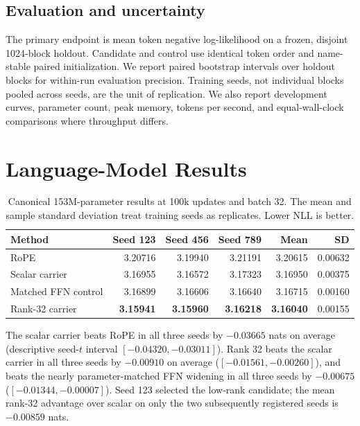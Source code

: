 \documentclass{article}
\begin{document}
\subsection{Evaluation and uncertainty}

The primary endpoint is mean token negative log-likelihood on a frozen,
disjoint 1024-block holdout. Candidate and control use identical token order
and name-stable paired initialization. We report paired bootstrap intervals
over holdout blocks for within-run evaluation precision. Training seeds, not
individual blocks pooled across seeds, are the unit of replication. We also
report development curves, parameter count, peak memory, tokens per second,
and equal-wall-clock comparisons where throughput differs.

\section{Language-Model Results}

\begin{table}[t]
\centering
\caption{Canonical 153M-parameter results at 100k updates and batch 32. The
mean and sample standard deviation treat training seeds as replicates. Lower
NLL is better.}
\label{tab:mature}
\begin{tabular}{lrrrrr}
\toprule
Method & Seed 123 & Seed 456 & Seed 789 & Mean & SD \\
\midrule
RoPE & 3.20716 & 3.19940 & 3.21191 & 3.20615 & 0.00632 \\
Scalar carrier & 3.16955 & 3.16572 & 3.17323 & 3.16950 & 0.00375 \\
Matched FFN control & 3.16899 & 3.16606 & 3.16640 & 3.16715 & 0.00160 \\
Rank-32 carrier & \textbf{3.15941} & \textbf{3.15960} & \textbf{3.16218}
  & \textbf{3.16040} & 0.00155 \\
\bottomrule
\end{tabular}
\end{table}

The scalar carrier beats RoPE in all three seeds by $-0.03665$ nats on
average (descriptive seed-$t$ interval $[-0.04320,-0.03011]$). Rank 32 beats
the scalar carrier in all three seeds by $-0.00910$ on average
($[-0.01561,-0.00260]$), and beats the nearly parameter-matched FFN widening
in all three seeds by $-0.00675$ ($[-0.01344,-0.00007]$). Seed 123 selected
the low-rank candidate; the mean rank-32 advantage over scalar on only the two
subsequently registered seeds is $-0.00859$ nats.
\end{document}
